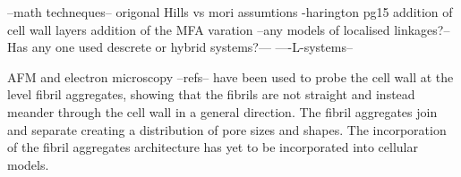 --math techneques--
origonal Hills vs mori assumtions -harington pg15 
addition of cell wall layers
addition of the MFA varation
--any models of localised linkages?--
Has any one used descrete or hybrid systems?---
----L-systems--

AFM and electron microscopy --refs-- have been used to probe the cell wall at the level fibril aggregates, showing that the fibrils are not straight and instead meander through the cell wall in a general direction. The fibril aggregates join and separate creating a distribution of pore sizes and shapes. The incorporation of the fibril aggregates architecture has yet to be incorporated into cellular models. 